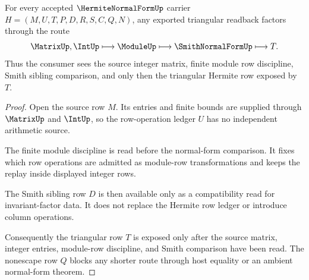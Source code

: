 \begin{theorem}
\label{thm:hermite-normal-form-row-reduction-readback}
For every accepted $\HermiteNormalFormUp$ carrier $H=(M,U,T,P,D,R,S,C,Q,N)$, any exported triangular readback factors through the route
$$
\MatrixUp,\IntUp \longmapsto \ModuleUp \longmapsto \SmithNormalFormUp \longmapsto T .
$$
Thus the consumer sees the source integer matrix, finite module row discipline, Smith sibling comparison, and only then the triangular Hermite row exposed by $T$.
\end{theorem}
\begin{proof}
Open the source row $M$. Its entries and finite bounds are supplied through $\MatrixUp$ and $\IntUp$, so the row-operation ledger $U$ has no independent arithmetic source.

The finite module discipline is read before the normal-form comparison. It fixes which row operations are admitted as module-row transformations and keeps the replay inside displayed integer rows.

The Smith sibling row $D$ is then available only as a compatibility read for invariant-factor data. It does not replace the Hermite row ledger or introduce column operations.

Consequently the triangular row $T$ is exposed only after the source matrix, integer entries, module-row discipline, and Smith comparison have been read. The nonescape row $Q$ blocks any shorter route through host equality or an ambient normal-form theorem.
\end{proof}





